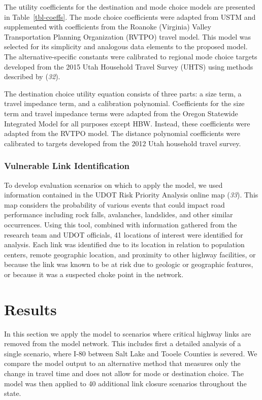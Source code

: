 \documentclass[
  letterpaper,
]{trb}
\begin{document}
The utility coefficients for the destination and mode choice models are
presented in Table~\ref{tbl-coeffs}. The mode choice coefficients were
adapted from USTM and supplemented with coefficients from the Roanoke
(Virginia) Valley Transportation Planning Organization (RVTPO) travel
model. This model was selected for its simplicity and analogous data
elements to the proposed model. The alternative-specific constants were
calibrated to regional mode choice targets developed from the 2015 Utah
Household Travel Survey (UHTS) using methods described by (\emph{32}).

The destination choice utility equation consists of three parts: a size
term, a travel impedance term, and a calibration polynomial.
Coefficients for the size term and travel impedance terms were adapted
from the Oregon Statewide Integrated Model for all purposes except HBW.
Instead, these coefficients were adapted from the RVTPO model. The
distance polynomial coefficients were calibrated to targets developed
from the 2012 Utah household travel survey.

\hypertarget{vulnerable-link-identification}{%
\subsubsection{Vulnerable Link
Identification}\label{vulnerable-link-identification}}

To develop evaluation scenarios on which to apply the model, we used
information contained in the UDOT Risk Priority Analysis online map
(\emph{33}). This map considers the probability of various events that
could impact road performance including rock falls, avalanches,
landslides, and other similar occurrences. Using this tool, combined
with information gathered from the research team and UDOT officials, 41
locations of interest were identified for analysis. Each link was
identified due to its location in relation to population centers, remote
geographic location, and proximity to other highway facilities, or
because the link was known to be at risk due to geologic or geographic
features, or because it was a suspected choke point in the network.


\hypertarget{sec-results}{%
\section{Results}\label{sec-results}}

In this section we apply the model to scenarios where critical highway
links are removed from the model network. This includes first a detailed
analysis of a single scenario, where I-80 between Salt Lake and Tooele
Counties is severed. We compare the model output to an alternative
method that measures only the change in travel time and does not allow
for mode or destination choice. The model was then applied to 40
additional link closure scenarios throughout the state.
\end{document}
